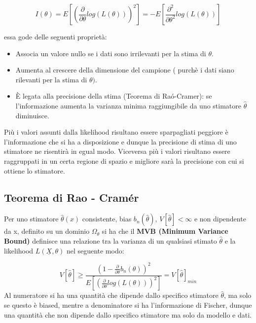 \begin{equation*}
		I(\theta) = E[(\frac{\partial}{\partial \theta}log(L(\theta)))^2] = -E[\frac{\partial^2}{\partial\theta^2}log(L(\theta))]
\end{equation*}

\noindent essa gode delle seguenti propriet\`{a}:

\begin{itemize}
	\item Associa un valore nullo se i dati sono irrilevanti per la stima di $\theta$.
	\item Aumenta al crescere della dimensione del campione ( purch\`{e} i dati siano rilevanti per la stima di $\theta)$.
	\item \`{E} legata alla precisione della stima (Teorema di Ra\'{o}-Cramer): se l'informazione aumenta la varianza minima raggiungibile da uno stimatore $\hat{\theta}$ diminuisce.
\end{itemize}

\noindent Pi\`{u} i valori assunti dalla likelihood risultano essere sparpagliati peggiore \`{e} l'informazione che si ha a disposizione e dunque la precisione di stima di uno stimatore ne risentir\`{a} in egual modo. Viceversa pi\`{u} i valori risultano essere raggruppati in un certa regione di spazio e migliore sar\`{a} la precisione con cui si ottiene lo stimatore.

\subsection{Teorema di Rao - Cram\'{e}r}

Per uno stimatore $\hat{\theta}(x)$ consistente, bias $b_n(\hat{\theta})$, $V[\hat{\theta}] < \infty$ e non dipendente da x, definito su un dominio $\Omega_{\theta}$ si ha che il \textbf{MVB (Minimum Variance Bound)} definisce una relazione tra la varianza di un qualsiasi stimato $\hat{\theta}$ e la likelihood $L(\underline{X},\theta)$ nel seguente modo:

\begin{equation}
	V[\hat{\theta}] \geq \frac{(1-\frac{\partial}{\partial \theta}b_n(\theta))^2}{E[(\frac{\partial}{\partial \theta}log(L(\theta)))^2]} = V[\hat{\theta}]_{min}
\end{equation}
\newline
\noindent Al numeratore si ha una quantit\`{a} che dipende dallo specifico stimatore $\hat{\theta}$, ma solo se questo \`{e} biased, mentre a denominatore si ha l'informazione di Fischer, dunque una quantit\`{a} che non dipende dallo specifico stimatore ma solo da modello e dati.
\newline

